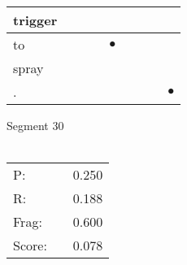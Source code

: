 \documentclass[landscape]{article}
\newcommand{\ssp}{\hspace{2pt}}
\newcommand{\mex}{\cellcolor{g}$\bullet$}
\begin{document}
\begin{tabular}{|l|p{10pt}|p{10pt}|p{10pt}|p{10pt}|p{10pt}|p{10pt}|p{10pt}|p{10pt}|}
\hline
\ssp trigger \ssp&\hspace{2pt}&\hspace{2pt}&\hspace{2pt}&\hspace{2pt}&\hspace{2pt}&\hspace{2pt}&\hspace{2pt}&\hspace{2pt}\\
\hline
\ssp \cellcolor{ref3}to \ssp&\hspace{2pt}&\hspace{2pt}&\hspace{2pt}&\hspace{2pt}\mex&\hspace{2pt}&\hspace{2pt}&\hspace{2pt}&\hspace{2pt}\\
\hline
\ssp spray \ssp&\hspace{2pt}&\hspace{2pt}&\hspace{2pt}&\hspace{2pt}&\hspace{2pt}&\hspace{2pt}&\hspace{2pt}&\hspace{2pt}\\
\hline
\ssp \cellcolor{ref7}. \ssp&\hspace{2pt}&\hspace{2pt}&\hspace{2pt}&\hspace{2pt}&\hspace{2pt}&\hspace{2pt}&\hspace{2pt}&\hspace{2pt}\mex\\
\hline
\end{tabular}

\vspace{6pt}
\noindent Segment 30\\\\
\noindent\begin{tabular}{lm{12pt}r}
\hline
P:&&0.250\\
R:&&0.188\\
Frag:&&0.600\\
Score:&&0.078\\
\end{tabular}
\end{document}

